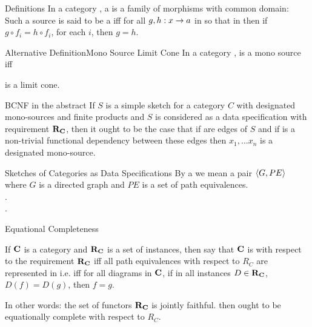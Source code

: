 \begin{frame}{Definitions} 
In a category \catc, a   is a family of morphisms with common domain: \\
\medskip
Such a source is said to be a   iff for all $g,h:x \rightarrow a$ in \catcw 
so that  
in \catcw then if $g \circ f_i = h \circ f_i$, for each $i$,  then $g=h$.
\end{frame}

\begin{frame}{Alternative Definition}{Mono Source Limit Cone}  
In a category ,
\scalebox{0.65}{

} is a mono source iff \\
\begin{center}
\scalebox{0.65}{

} 
is a limit cone.
\end{center}
\end{frame}

\begin{frame}{BCNF in the abstract}
If $S$ is a simple sketch for a category $C$ with designated mono-sources  and finite products
and $S$ is considered as a data specification with requirement $\textbf{R}_{\textbf{C}}$, then it ought to be the case
that if  
are edges of $S$
and if   is a non-trivial functional dependency  between these edges then
$x_1,...x_n$ is a designated mono-source.
\end{frame}


\begin{frame}{Sketches of Categories as Data Specifications}
By a  we mean a pair $\langle G,PE\rangle$ where 
$G$ is a directed graph and $PE$ is a set of path equivalences. \\
\medskip
\goodnessoneA. \\
\medskip
\goodnessoneB.
\end{frame}

\begin{frame}{Equational Completeness}
\begin{definition}
If $\textbf{C}$ is a  category and $\textbf{R}_{\textbf{C}}$ is a set of instances,
 then say that  $\textbf{C}$ is  with respect 
to the requirement $\textbf{R}_{\textbf{C}}$ iff all path equivalences with respect to $R_C$ are represented in \catcw 
i.e. iff for all diagrams \fgparalleldiagram in $\textbf{C}$,  
if in all instances $D \in \textbf{R}_{\textbf{C}}$, $D(f)=D(g)$,  then $f=g$.
\end{definition}

In other words:
the set of functors $\textbf{R}_{\textbf{C}}$ is jointly faithful.
\medskip
{} \IfSforCwithRCwords then \catcw ought to be equationally complete
with respect to $R_C$.
\end{frame}

